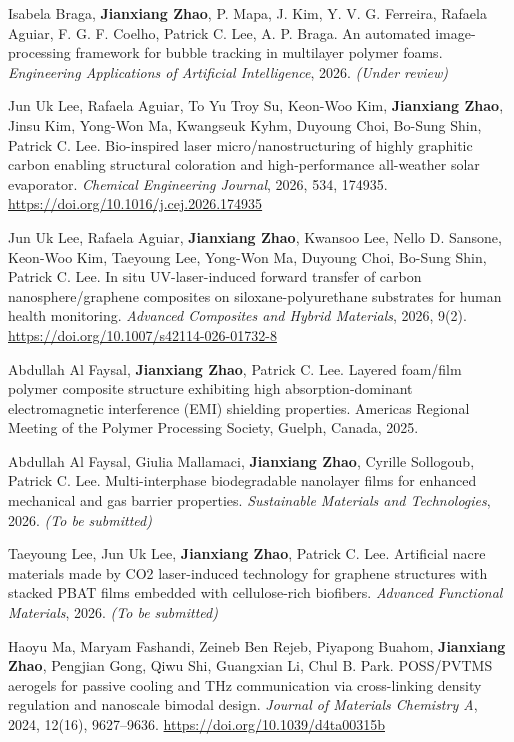 \begin{pubcounter}
\item Isabela Braga, \textbf{Jianxiang Zhao}, P. Mapa, J. Kim, Y. V. G. Ferreira, Rafaela Aguiar, F. G. F. Coelho, Patrick C. Lee, A. P. Braga. An automated image-processing framework for bubble tracking in multilayer polymer foams. \textit{Engineering Applications of Artificial Intelligence}, 2026. \textit{(Under review)}
\item Jun Uk Lee, Rafaela Aguiar, To Yu Troy Su, Keon-Woo Kim, \textbf{Jianxiang Zhao}, Jinsu Kim, Yong-Won Ma, Kwangseuk Kyhm, Duyoung Choi, Bo-Sung Shin, Patrick C. Lee. Bio-inspired laser micro/nanostructuring of highly graphitic carbon enabling structural coloration and high-performance all-weather solar evaporator. \textit{Chemical Engineering Journal}, 2026, 534, 174935. \url{https://doi.org/10.1016/j.cej.2026.174935}
\item Jun Uk Lee, Rafaela Aguiar, \textbf{Jianxiang Zhao}, Kwansoo Lee, Nello D. Sansone, Keon-Woo Kim, Taeyoung Lee, Yong-Won Ma, Duyoung Choi, Bo-Sung Shin, Patrick C. Lee. In situ UV-laser-induced forward transfer of carbon nanosphere/graphene composites on siloxane-polyurethane substrates for human health monitoring. \textit{Advanced Composites and Hybrid Materials}, 2026, 9(2). \url{https://doi.org/10.1007/s42114-026-01732-8}
\item Abdullah Al Faysal, \textbf{Jianxiang Zhao}, Patrick C. Lee. Layered foam/film polymer composite structure exhibiting high absorption-dominant electromagnetic interference (EMI) shielding properties. Americas Regional Meeting of the Polymer Processing Society, Guelph, Canada, 2025.
\item Abdullah Al Faysal, Giulia Mallamaci, \textbf{Jianxiang Zhao}, Cyrille Sollogoub, Patrick C. Lee. Multi-interphase biodegradable nanolayer films for enhanced mechanical and gas barrier properties. \textit{Sustainable Materials and Technologies}, 2026. \textit{(To be submitted)}
\item Taeyoung Lee, Jun Uk Lee, \textbf{Jianxiang Zhao}, Patrick C. Lee. Artificial nacre materials made by CO2 laser-induced technology for graphene structures with stacked PBAT films embedded with cellulose-rich biofibers. \textit{Advanced Functional Materials}, 2026. \textit{(To be submitted)}
\item Haoyu Ma, Maryam Fashandi, Zeineb Ben Rejeb, Piyapong Buahom, \textbf{Jianxiang Zhao}, Pengjian Gong, Qiwu Shi, Guangxian Li, Chul B. Park. POSS/PVTMS aerogels for passive cooling and THz communication via cross-linking density regulation and nanoscale bimodal design. \textit{Journal of Materials Chemistry A}, 2024, 12(16), 9627--9636. \url{https://doi.org/10.1039/d4ta00315b}

\end{pubcounter}

